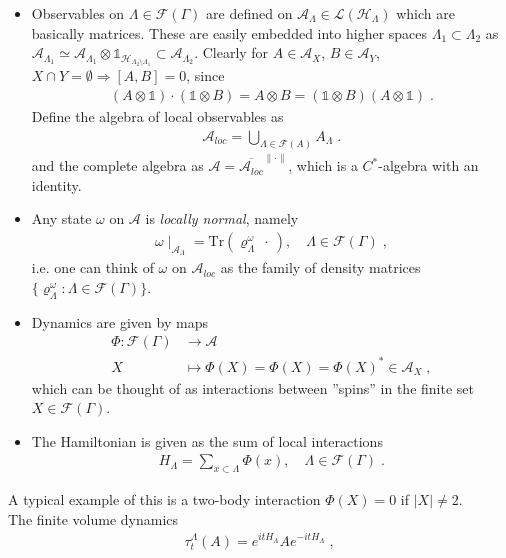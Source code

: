 \documentclass[
a4paper, %
11pt, %
onecolumn, %
openany, %
]{memoir}
\theoremstyle{definition}
\theoremstyle{remark}
\theoremstyle{plain}
\begin{document}
\begin{itemize}
\item Observables on $\Lambda\in\mathcal{F}(\Gamma)$ are defined on $\mathcal{A}_{\Lambda}\in\mathcal{L}(\mathcal{H}_{\Lambda})$ which are basically matrices. These are easily embedded into higher spaces $\Lambda_1\subset\Lambda_2$ as $\mathcal{A}_{\Lambda_1}\simeq \mathcal{A}_{\Lambda_1}\otimes\mathds{1}_{\mathcal{H}_{\Lambda_2\setminus \Lambda_1}}\subset \mathcal{A}_{\Lambda_2}$. Clearly for $A\in\mathcal{A}_X$, $B\in\mathcal{A}_Y$, $X\cap Y=\emptyset\Rightarrow[A,B]=0$, since \begin{align}
(A\otimes \mathds{1})\cdot(\mathds{1}\otimes B)=A\otimes B=(\mathds{1}\otimes B)(A\otimes\mathds{1})\; .
\end{align}
 Define the algebra of local observables as 
\begin{align} 
\mathcal{A}_{loc}=\bigcup_{\Lambda\in\mathcal{F}(A)}A_{\Lambda}\;.
\end{align}
and the complete algebra as $\mathcal{A}=\overline{\mathcal{A}_{loc}}^{\|\cdot\|}$, which is a $C^*$-algebra with an identity.
\item Any state $\omega$ on $\mathcal{A}$ is \textit{locally normal}, namely \begin{align}
\omega\mid_{\mathcal{A}_{\Lambda}}=\mathrm{Tr}(\varrho_{\Lambda}^{\omega}~\cdot~),\quad  \Lambda\in\mathcal{F}(\Gamma)\;,
\end{align}
i.e. one can think of $\omega$ on $\mathcal{A}_{loc}$ as the family of density matrices $\{\varrho_{\Lambda}^{\omega}:\Lambda\in\mathcal{F}(\Gamma)\}$.
\item Dynamics are given by maps\begin{align}
\Phi:\mathcal{F}(\Gamma)&\longrightarrow \mathcal{A}\\
X &\longmapsto \Phi(X)=\Phi(X)=\Phi(X)^*\in\mathcal{A}_X\; ,
\end{align}
which can be thought of as interactions between ''spins'' in the finite set $X\in\mathcal{F}(\Gamma)$. 
\item The Hamiltonian is given as the sum of local interactions\begin{align}
H_{\Lambda}=\sum_{x\subset\Lambda}\Phi(x),\quad \Lambda\in\mathcal{F}(\Gamma)\; .
\end{align}
\end{itemize}
A typical example of this is a two-body interaction $\Phi(X)=0$ if $|X|\neq 2$.\\
The finite volume dynamics \begin{align}
\tau_t^{\Lambda}(A)=e^{itH_{\Lambda}}Ae^{-itH_{\Lambda}}\; ,
\end{align}
\end{document}
